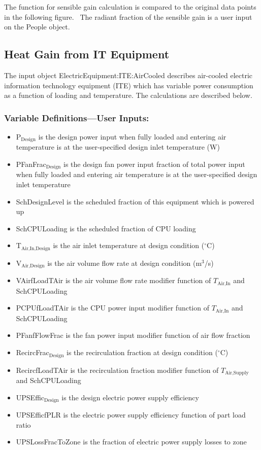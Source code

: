 The function for sensible gain calculation is compared to the original data points in the following figure.~ The radiant fraction of the sensible gain is a user input on the People object.

\subsection{Heat Gain from IT Equipment}\label{heat-gain-from-it-equipment}

The input object ElectricEquipment:ITE:AirCooled describes air-cooled electric information technology equipment (ITE) which has variable power consumption as a function of loading and temperature. The calculations are described below.

\subsubsection{Variable Definitions---User Inputs:}\label{variable-definitions-user-inputs}

\begin{itemize}
\tightlist
\item
  P$_\textrm{Design}$ is the design power input when fully loaded and entering air temperature is at the user-specified design inlet temperature (W)
\item
  PFanFrac$_\textrm{Design}$ is the design fan power input fraction of total power input when fully loaded and entering air temperature is at the user-specified design inlet temperature
\item
  SchDesignLevel is the scheduled fraction of this equipment which is powered up
\item
  SchCPULoading is the scheduled fraction of CPU loading
\item
  T$_\textrm{Air,In,Design}$ is the air inlet temperature at design condition ($^\circ$C)
\item
  V$_\textrm{Air,Design}$ is the air volume flow rate at design condition (m$^3$/s)
\item
  VAirfLoadTAir is the air volume flow rate modifier function of  $T_{\textrm{Air,In}}$ and SchCPULoading
\item
  PCPUfLoadTAir is the CPU power input modifier function of $T_{\textrm{Air,In}}$ and SchCPULoading
\item
  PFanfFlowFrac is the fan power input modifier function of air flow fraction
\item
  RecircFrac$_\textrm{Design}$ is the recirculation fraction at design condition ($^\circ$C)
\item
  RecircfLoadTAir is the recirculation fraction modifier function of  $T_{\textrm{Air,Supply}}$ and SchCPULoading
\item
  UPSEffic$_\textrm{Design}$ is the design electric power supply efficiency
\item
  UPSEfficfPLR is the electric power supply efficiency function of part load ratio
\item
  UPSLossFracToZone is the fraction of electric power supply losses to zone
\end{itemize}


